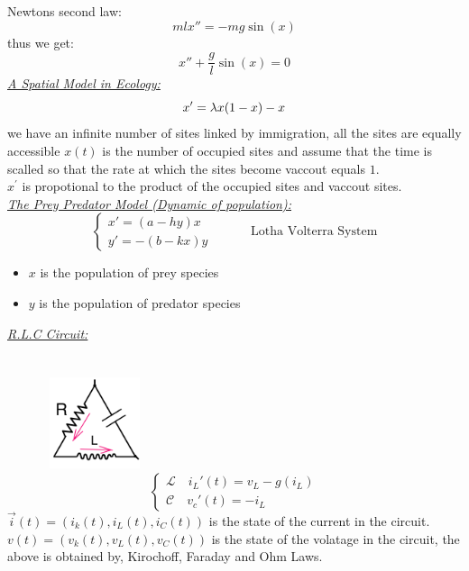 Newtons second law:
\[
m l x'' = -mg \sin{(x) }
\]
thus we get: 
\[
x'' + \frac{g}{l} \sin{ (x) } = 0
\]
\underline{\emph{A Spatial Model in Ecology:}} 
\[
x' = \lambda x (1 - x)  - x
\]
we have an infinite number of sites linked by immigration, all the sites are equally accessible
$x(t)$ is the number of occupied sites and assume that the time is scalled 
so that the rate at which the sites become vaccout equals $1$. \\
$x^{'} $ is propotional to the product of the occupied sites and vaccout sites. \\
\underline{\emph{The Prey Predator Model (Dynamic of population):}} 
\[
\begin{cases}
x' = (a - hy) x \\
y' = -(b - kx) y 
\end{cases}
\quad \quad 
\quad 
\text{Lotha Volterra System} 
\]
\begin{itemize}
  \item $x $ is the population of prey species 
    \item $y $ is the population of predator species 
\end{itemize}
\underline{\emph{R.L.C Circuit:}} 
\\
\\
\\
$\quad \quad \quad  $ \includegraphics[width=0.2\textwidth]{images/rl1.png}
\[
  \begin{cases}
  \mathcal{L}  \quad 
  i_{L}' (t) = v_{L} - g(i_{L})   \\
  \mathcal{C} \quad 
  v_{c}'(t) = - i_{L} 
  \end{cases}
\]
$\vec{i}(t) = (i_{k}(t), i_{L}(t), i_{C}(t)  )$ is the state of the current 
in the circuit.\\
$v(t) = (v_{k}(t) , v_{L}(t) , v_{C}(t) )  $ is the state of the volatage in the circuit, 
the above is obtained by, Kirochoff, Faraday and Ohm Laws.

